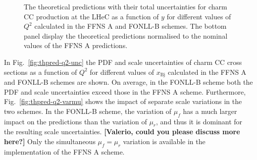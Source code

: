 \documentclass[pdftex,twocolumn,epjc3]{svjour3}          %
\newcommand{\xbj}{\ensuremath{x_{\text{Bj}}}\xspace}
\newcommand{\fonll} {{FONLL-B}\xspace}
\newcommand{\ffns} {{FFNS A}\xspace}
\begin{document}
\begin{figure}
    \centering
    \caption{The theoretical predictions with their total uncertainties for charm CC production at the LHeC as a function of $y$ for different values of $Q^2$ calculated in the \ffns and \fonll schemes. The bottom panel display the theoretical predictions normalised to the nominal values of the \ffns predictions.}
    \label{fig:thpred-y}
\end{figure}

In Fig.~\ref{fig:thpred-q2-unc} the PDF and scale uncertainties of charm CC cross sections as a function of $Q^2$ for different values of \xbj calculated in the \ffns and \fonll schemes are shown. On average, in the \fonll scheme both the PDF and scale uncertainties exceed those in the \ffns scheme. Furthermore, Fig.~\ref{fig:thpred-q2-varmu} shows the impact of separate scale variations in the two schemes. In the \fonll scheme, the variation of $\mu_f$ has a much larger impact on the predictions than the variation of $\mu_r$, and thus it is dominant for the resulting scale uncertainties. {\bf [Valerio, could you please discuss more here?]} Only the simultaneous $\mu_f = \mu_r$ variation is available in the implementation of the \ffns scheme. 
\end{document}
